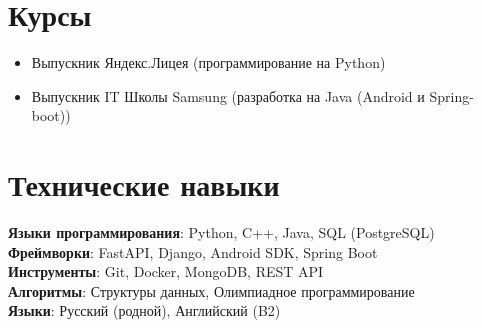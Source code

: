 \documentclass[letterpaper,11pt]{article}
\newcommand{\resumeItem}[1]{
  \item\small{
    {#1 \vspace{-2pt}}
  }
}
\newcommand{\resumeSubHeadingListStart}{\begin{itemize}[leftmargin=0.15in, label={}]}
\newcommand{\resumeSubHeadingListEnd}{\end{itemize}}
\begin{document}
\section{Курсы}
  \resumeSubHeadingListStart
    \resumeItem{Выпускник Яндекс.Лицея (программирование на Python)}
    \resumeItem{Выпускник IT Школы Samsung (разработка на Java (Android и Spring-boot))}
  \resumeSubHeadingListEnd

\section{Технические навыки}
 \begin{itemize}[leftmargin=0.15in, label={}]
    \small{\item{
     \textbf{Языки программирования}{: Python, C++, Java, SQL (PostgreSQL)} \\
     \textbf{Фреймворки}{: FastAPI, Django, Android SDK, Spring Boot} \\
     \textbf{Инструменты}{: Git, Docker, MongoDB, REST API} \\
     \textbf{Алгоритмы}{: Структуры данных, Олимпиадное программирование} \\
     \textbf{Языки}{: Русский (родной), Английский (B2)}
    }}
 \end{itemize}
\end{document}
